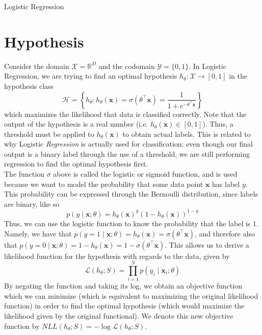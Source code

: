 \documentclass[12pt]{article}
\newcommand{\curly}[1]{\left\{#1\right\}}
\begin{document}
\begin{center}
	\LARGE{Logistic Regression}
\end{center}

\section{Hypothesis}

Consider the domain $\mathcal{X} = \mathbb{R}^D$ and the codomain  $\mathcal{Y} = \{0, 1\}$. In Logistic Regression, we are trying to find an optimal hypothesis $h_{\theta} : \mathcal{X} \rightarrow [0, 1]$ in the hypothesis class
\[ \mathcal{H} = \curly{ h_{\theta} : h_{\theta}(\mathbf{x}) = \sigma(\theta^\top\mathbf{x}) = \frac{1}{1 + e^{-\theta^\top\mathbf{x}}}} \]
which maximizes the likelihood that data is classified correctly. Note that the output of the hypothesis is a real number (i.e. $h_{\theta}(\mathbf{x}) \in [0, 1]$). Thus, a threshold must be applied to $h_\theta(\mathbf{x})$ to obtain actual labels. This is related to why Logistic \textit{Regression} is actually used for classification: even though our final output is a binary label through the use of a threshold, we are still performing regression to find the optimal hypothesis first.
\\\newline
The function $\sigma$ above is called the logistic or sigmoid function, and is used because we want to model the probability that some data point $\mathbf{x}$ has label $y$. This probability can be expressed through the Bernoulli distribution, since labels are binary, like so
\[ p(y \mid \mathbf{x}; \theta) = h_\theta(\mathbf{x})^y(1 - h_\theta(\mathbf{x}))^{1-y} \]
Thus, we can use the logistic function to know the probability that the label is $1$. Namely, we have that $p(y = 1 \mid \mathbf{x}; \theta) = h_\theta(\mathbf{x}) = \sigma(\theta^\top\mathbf{x})$, and therefore also that $p(y = 0 \mid \mathbf{x}; \theta) = 1 - h_\theta(\mathbf{x}) = 1 - \sigma(\theta^\top\mathbf{x})$. This allows us to derive a likelihood function for the hypothesis with regards to the data, given by
\[ \mathcal{L}(h_\theta; S) = \prod_{i=1}^{N}p(y_i \mid \mathbf{x}_i; \theta) \]
By negating the function and taking its log, we obtain an objective function which we can minimize (which is equivalent to maximizing the original likelihood function) in order to find the optimal hypothesis (which would maximize the likelihood given by the original functional). We denote this new objective function by $NLL(h_\theta;S) = -\log\mathcal{L}(h_\theta; S)$.
\end{document}
